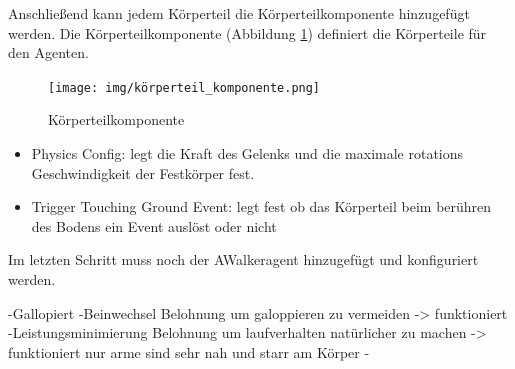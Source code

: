 Anschließend kann jedem Körperteil die Körperteilkomponente hinzugefügt werden. Die Körperteilkomponente (Abbildung \ref{fig:körperteil_komponente}) definiert die Körperteile für den Agenten.
\begin{figure}[H]
  \centering  
  \texttt{[image: img/körperteil\_komponente.png]}
  \caption{Körperteilkomponente}
  \label{fig:körperteil_komponente}
\end{figure}

\begin{itemize}
  \item Physics Config: legt die Kraft des Gelenks und die maximale rotations Geschwindigkeit der Festkörper fest.
  \item Trigger Touching Ground Event: legt fest ob das Körperteil beim berühren des Bodens ein Event auslöst oder nicht
\end{itemize}

Im letzten Schritt muss noch der AWalkeragent hinzugefügt und konfiguriert werden.

-Gallopiert
-Beinwechsel Belohnung um galoppieren zu vermeiden -> funktioniert
-Leistungsminimierung Belohnung um laufverhalten natürlicher zu machen -> funktioniert nur arme sind sehr nah und starr am Körper
-
